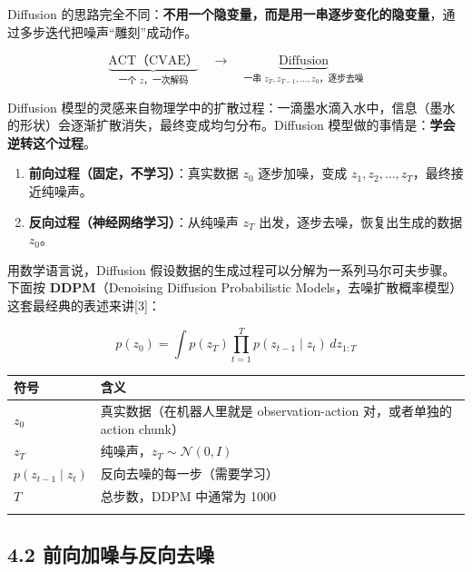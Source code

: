 \documentclass[
  chinese,
]{ctexart}
\providecommand{\tightlist}{%
  \setlength{\itemsep}{0pt}\setlength{\parskip}{0pt}}
\begin{document}
Diffusion
的思路完全不同：\textbf{不用一个隐变量，而是用一串逐步变化的隐变量}，通过多步迭代把噪声``雕刻''成动作。

\[
\underbrace{\text{ACT（CVAE）}}_{\text{一个 } z \text{，一次解码}} \quad\longrightarrow\quad \underbrace{\text{Diffusion}}_{\text{一串 } z_T, z_{T-1}, \ldots, z_0 \text{，逐步去噪}}
\]

Diffusion
模型的灵感来自物理学中的扩散过程：一滴墨水滴入水中，信息（墨水的形状）会逐渐扩散消失，最终变成均匀分布。Diffusion
模型做的事情是：\textbf{学会逆转这个过程}。

\begin{enumerate}
\def\labelenumi{\arabic{enumi}.}
\tightlist
\item
  \textbf{前向过程（固定，不学习）}：真实数据 \(z_0\) 逐步加噪，变成
  \(z_1, z_2, \ldots, z_T\)，最终接近纯噪声。
\item
  \textbf{反向过程（神经网络学习）}：从纯噪声 \(z_T\)
  出发，逐步去噪，恢复出生成的数据 \(z_0\)。
\end{enumerate}

用数学语言说，Diffusion
假设数据的生成过程可以分解为一系列马尔可夫步骤。下面按
\textbf{DDPM}（Denoising Diffusion Probabilistic
Models，去噪扩散概率模型）这套最经典的表述来讲{[}3{]}：

\[
p(z_0) = \int p(z_T) \prod_{t=1}^{T} p(z_{t-1} \mid z_t) \, dz_{1:T}
\]

\begin{center}
\begin{tabular}{@{}>{\raggedright\arraybackslash}p{} >{\raggedright\arraybackslash}p{}@{}}
\toprule\noalign{}
符号 & 含义 \\
\midrule\noalign{}
\(z_0\) & 真实数据（在机器人里就是 observation-action 对，或者单独的 action chunk） \\
\(z_T\) & 纯噪声，\(z_T \sim \mathcal{N}(0, I)\) \\
\(p(z_{t-1} \mid z_t)\) & 反向去噪的每一步（需要学习） \\
\(T\) & 总步数，DDPM 中通常为 1000 \\
\bottomrule\noalign{}
\end{tabular}
\end{center}

\subsection{4.2
前向加噪与反向去噪}\label{ux524dux5411ux52a0ux566aux4e0eux53cdux5411ux53bbux566a}
\end{document}
